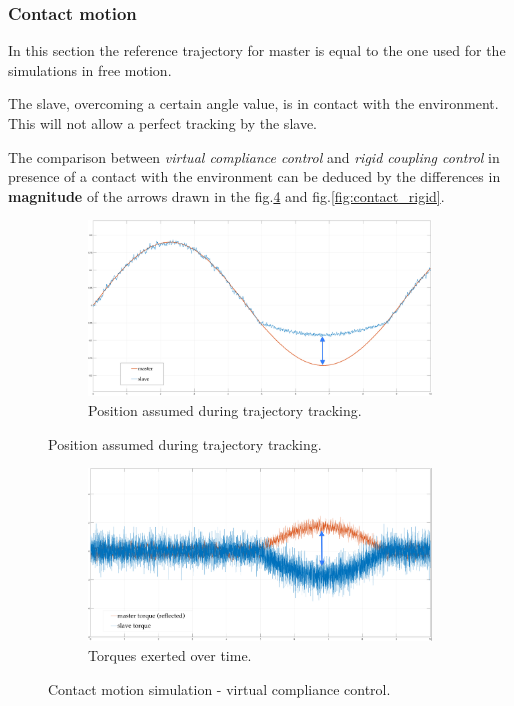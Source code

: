 \subsubsection{Contact motion}

In this section the reference trajectory for master is equal to the one used for the simulations in free motion.

The slave, overcoming a certain angle value, is in contact with the environment. This will not allow a perfect tracking by the slave.

The comparison between \textsl{virtual compliance control} and \textsl{rigid coupling control} in presence of a contact with the environment can be deduced by the
differences in \textbf{magnitude} of the arrows drawn in the fig.\ref{fig:contact_virtual} and fig.\ref{fig:contact_rigid}.

\begin{figure}[H]
	\begin{subfigure}{1\linewidth}
		\centering
		\includegraphics[width=\textwidth, height=0.41\textwidth]{Images/setPointContactReacPosArrow}
		\caption{Position assumed during trajectory tracking.}
		\label{fig:ContactSetPos}
	\end{subfigure}	
\end{figure}
\begin{figure}[H]\ContinuedFloat
	\begin{subfigure}{1\linewidth}
		\centering
		\includegraphics[width=\textwidth, height=0.41\textwidth]{Images/setPointContactReacTorArrow}
		\caption{Torques exerted over time.}
		\label{fig:ContactSetTor}
	\end{subfigure}	
 \caption{Contact motion simulation - virtual compliance control.}
 \label{fig:contact_virtual}
\end{figure}

